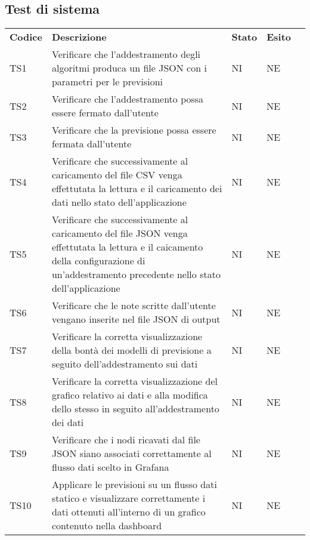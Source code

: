 
\subsection{Test di sistema}

\begin{longtable} {
		>{}p{15mm} 
		>{}p{79.5mm}
		>{}p{15mm} 
		>{}p{15mm}
		>{}p{0mm}}
	\rowcolor{gray!50}
	\textbf{Codice} & \textbf{Descrizione} & \textbf{Stato} & \textbf{Esito} &\TBstrut \\
	TS1 & Verificare che l'addestramento degli algoritmi produca un file JSON con i parametri per le previsioni & NI & NE  &\TBstrut \\ [2mm]
	TS2 & Verificare che l'addestramento possa essere fermato dall'utente & NI & NE  &\TBstrut \\ [2mm]
	TS3 & Verificare che la previsione possa essere fermata dall'utente & NI & NE  &\TBstrut \\ [2mm]
	TS4 & Verificare che successivamente al caricamento del file CSV venga effettutata la lettura e il caricamento dei dati nello stato dell'applicazione & NI & NE  &\TBstrut \\ [2mm]
	TS5 & Verificare che successivamente al caricamento del file JSON venga effettutata la lettura e il caicamento della configurazione di un'addestramento precedente nello stato dell'applicazione & NI & NE  &\TBstrut \\ [2mm]
	TS6 & Verificare che le note scritte dall'utente vengano inserite nel file JSON di output & NI & NE  &\TBstrut \\ [2mm]
	TS7 & Verificare la corretta visualizzazione della bontà dei modelli di previsione a seguito dell'addestramento sui dati & NI & NE  &\TBstrut \\ [2mm]
	TS8 & Verificare la corretta visualizzazione del grafico relativo ai dati e alla modifica dello stesso in seguito all'addestramento dei dati & NI & NE  &\TBstrut \\ [2mm]
	TS9 & Verificare che i nodi ricavati dal file JSON siano associati correttamente al flusso dati scelto in Grafana\glo & NI & NE &\TBstrut \\ [2mm]
	TS10 & Applicare le previsioni su un flusso dati statico e visualizzare correttamente i dati ottenuti all'interno di un grafico contenuto nella dashboard\glo & NI & NE  &\TBstrut \\ [2mm]

\end{longtable}
